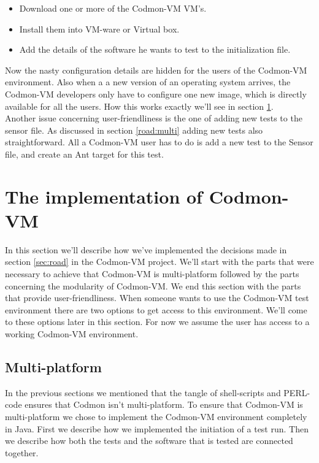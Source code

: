 \documentclass{article}
\newcommand{\project}{Codmon-VM}
\begin{document}
\begin{itemize}
\item Download one or more of the \project{} VM's.
\item Install them into VM-ware or Virtual box.
\item Add the details of the software he wants to test to the initialization file.
\end{itemize}


\noindent Now the nasty configuration details are hidden for the users of the \project{} environment. Also when a a new version of an operating system arrives, the \project{} developers only have to 
configure one new image, which is directly available for all the users. How this works exactly we'll see in section \ref{sec:Codmon2.0}. \\

\noindent Another issue concerning user-friendliness is the one of adding new tests to the sensor file. As discussed in section \ref{road:multi} adding new tests also straightforward. All a \project{} user 
has to do is add a new test to the Sensor file, and create an Ant target for this test. 

\newpage
\section{The implementation of \project{}}
\label{sec:Codmon2.0}
In this section we'll describe how we've implemented the decisions made in section \ref{sec:road} in the \project{} project. We'll start with the parts that were necessary to achieve that \project{} is multi-platform 
followed by the parts concerning the modularity of \project{}. We end this section with the parts that provide user-friendliness. When someone wants to use the \project{} test environment there are two options  
to get access to this environment. We'll come to these options later in this section. For now we assume the user has access to a working \project{} environment.

\subsection{Multi-platform}
\label{imp:multi}
In the previous sections we mentioned that the tangle of shell-scripts and PERL-code ensures that Codmon isn't multi-platform. To ensure that \project{} is multi-platform we chose to implement the 
\project{} environment completely in Java. First we describe how we implemented the initiation of a test run. Then we describe how both the tests and the software that is tested are connected together.
\end{document}
